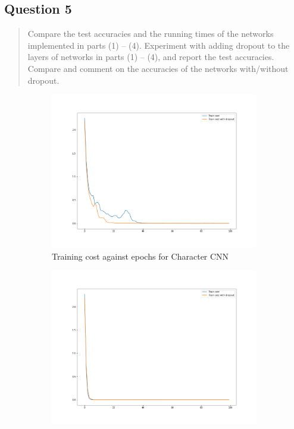 \subsection{Question 5}
\begin{quote}
Compare the test accuracies and the running times of the networks implemented in parts (1) – (4). Experiment with adding dropout to the layers of networks in parts (1) – (4), and report the test accuracies. Compare and comment on the accuracies of the networks with/without
dropout.
\end{quote}

\begin{figure}[H]
    \begin{subfigure}{0.5\textwidth}
        \centering
        \includegraphics[width=1\linewidth]{assets/plots2/q1_3.png}
        \caption{Training cost against epochs for Character CNN}
    \end{subfigure}
    \begin{subfigure}{0.5\textwidth}
        \centering
        \includegraphics[width=1\linewidth]{assets/plots2/q2_3.png}

\end{subfigure}
\end{figure}
